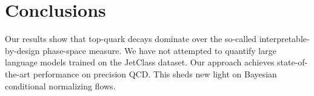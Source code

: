 \section{Conclusions}\label{sec:conclusions}

Our results show that top-quark decays dominate over the so-called
interpretable-by-design phase-space measure. We have not attempted to
quantify large language models trained on the JetClass dataset. Our
approach achieves state-of-the-art performance on precision QCD. This
sheds new light on Bayesian conditional normalizing flows.

